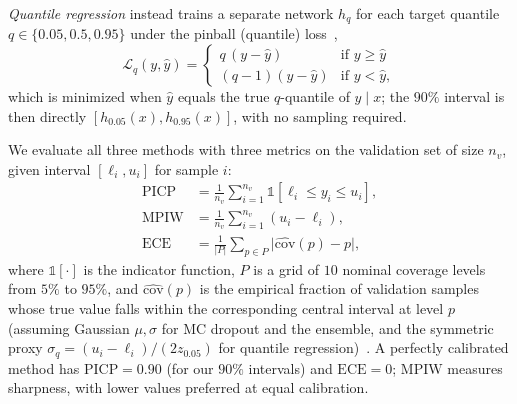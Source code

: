 \documentclass[graybox]{SNmult}
\begin{document}
\emph{Quantile regression} instead trains a separate network $h_q$ for each
target quantile $q \in \{0.05, 0.5, 0.95\}$ under the pinball
(quantile) loss~\cite{koenker1978regression,rasp2018neural},
\begin{equation}
  \mathcal{L}_q(y, \hat{y}) =
  \begin{cases}
    q\,(y - \hat{y}) & \text{if } y \ge \hat{y} \\
    (q-1)(y - \hat{y}) & \text{if } y < \hat{y},
  \end{cases}
  \label{eq:pinball}
\end{equation}
which is minimized when $\hat{y}$ equals the true $q$-quantile of $y \mid x$; the
$90\%$ interval is then directly $[h_{0.05}(x), h_{0.95}(x)]$, with no
sampling required.

We evaluate all three methods with three metrics on the validation set of size
$n_v$, given interval $[\ell_i, u_i]$ for sample $i$:
\begin{align}
  \mathrm{PICP} &= \frac{1}{n_v}\sum_{i=1}^{n_v} \mathbb{1}[\ell_i \le y_i \le u_i],
  \label{eq:picp} \\
  \mathrm{MPIW} &= \frac{1}{n_v}\sum_{i=1}^{n_v} (u_i - \ell_i),
  \label{eq:mpiw} \\
  \mathrm{ECE} &= \frac{1}{|P|}\sum_{p \in P}
    \bigl\lvert \widehat{\mathrm{cov}}(p) - p \bigr\rvert,
  \label{eq:ece}
\end{align}
where $\mathbb{1}[\cdot]$ is the indicator function, $P$ is a grid of $10$
nominal coverage levels from $5\%$ to $95\%$, and $\widehat{\mathrm{cov}}(p)$ is
the empirical fraction of validation samples whose true value falls within the
corresponding central interval at level $p$ (assuming Gaussian
$\mu,\sigma$ for MC dropout and the ensemble, and the symmetric proxy
$\sigma_q = (u_i - \ell_i)/(2z_{0.05})$ for quantile
regression)~\cite{guo2017calibration,kuleshov2018calibrated}. A perfectly
calibrated method has $\mathrm{PICP} = 0.90$ (for our $90\%$ intervals) and
$\mathrm{ECE} = 0$; $\mathrm{MPIW}$ measures sharpness, with lower values
preferred at equal calibration.
\end{document}
